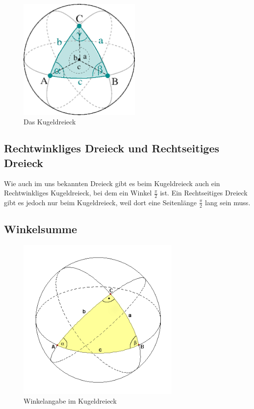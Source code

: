 \begin{figure}
	\begin{center}
		\includegraphics[width=6cm]{papers/nav/bilder/kugel1.png}
		\caption[Das Kugeldreieck]{Das Kugeldreieck}
	\end{center}
	
\end{figure}

\subsection{Rechtwinkliges Dreieck und Rechtseitiges Dreieck}
Wie auch im uns bekannten Dreieck gibt es beim Kugeldreieck auch ein Rechtwinkliges Kugeldreieck, bei dem ein Winkel $\frac{\pi}{2}$ ist. 
Ein Rechtseitiges Dreieck gibt es jedoch nur beim Kugeldreieck, weil dort eine Seitenlänge $\frac{\pi}{2}$ lang sein muss.

\subsection{Winkelsumme}
\begin{figure}
	
	\begin{center}
		\includegraphics[width=8cm]{papers/nav/bilder/kugel2.png}
		\caption[Winkelangabe im Kugeldreieck]{Winkelangabe im Kugeldreieck}
	\end{center}	
\end{figure}


